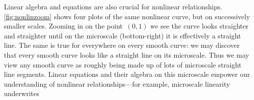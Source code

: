 Linear algebra and equations are also crucial for nonlinear relationships.
\cref{fig:nonlinzoom} shows four plots of the same nonlinear curve, but on successively smaller scales.
Zooming in on the point~\((0,1)\) we see the curve looks straighter and straighter until on the microscale (bottom-right) it is effectively a straight line.
The same is true for everywhere on every smooth curve: we may discover that every smooth curve looks like a straight line on its microscale. 
Thus we may view any smooth curve as roughly being made up of lots of microscale straight line segments.
Linear equations and their algebra on this microscale empower our understanding of nonlinear relationships---for example, microscale linearity underwrites 
 




\endinput





